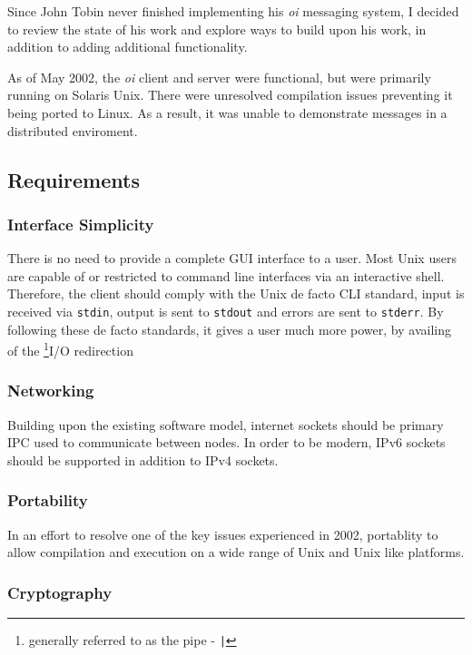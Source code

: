 Since John Tobin never finished implementing his \emph{oi} messaging
system, I decided to review the state of his work and explore ways to
build upon his work, in addition to adding additional functionality.


As of May 2002, the \emph{oi} client and server were functional, but
were primarily running on Solaris Unix. There were unresolved
compilation issues preventing it being ported to Linux. As a result, it
was unable to demonstrate messages in a distributed enviroment.

\subsection{Requirements}

\subsubsection{Interface Simplicity}

There is no need to provide a complete GUI interface to a user. Most
Unix users are capable of or restricted to command line interfaces via
an interactive shell. Therefore, the client should comply with the 
Unix de facto CLI standard, input is received via \verb!stdin!, output
is sent to \verb!stdout! and errors are sent to \verb!stderr!. By
following these de facto standards, it gives a user much more power, by
availing of the 
\footnote{generally referred to as the pipe - \verb!|!}{I/O redirection}

\subsubsection{Networking}

Building upon the existing software model, internet sockets should be 
primary IPC used to communicate between nodes. In order to be modern,
IPv6 sockets should be supported in addition to IPv4 sockets.

\subsubsection{Portability}

In an effort to resolve one of the key issues experienced in 2002, 
portablity to allow compilation and execution on a wide range of Unix
and Unix like platforms.

\subsubsection{Cryptography}

